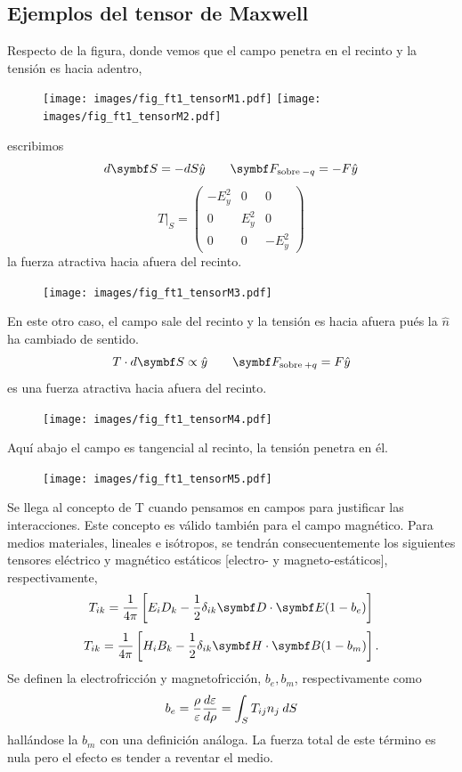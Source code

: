 \documentclass[10pt,oneside]{CBFT_book}
\begin{document}
\subsection{Ejemplos del tensor de Maxwell}

Respecto de la figura, donde vemos que el campo penetra en el recinto y la tensión es hacia adentro,
\begin{figure}[htb]
	\begin{center}
	\texttt{[image: images/fig\_ft1\_tensorM1.pdf]}
	\texttt{[image: images/fig\_ft1\_tensorM2.pdf]}	
	\end{center}
	\caption{}
\end{figure} 
escribimos 
\[
	d\vb{S} = -dS\hat{y} \qquad \vb{F}_{\text{sobre}\:-q} = -F\hat{y}
\]
\[
	T|_S = \begin{pmatrix}
	        -E_y^2	& 0 	& 0 \\
		0	& E_y^2	& 0 \\
		0	& 0	& -E_y^2
	       \end{pmatrix}
\]
la fuerza atractiva hacia afuera del recinto.
\begin{figure}[htb]
	\begin{center}
	\texttt{[image: images/fig\_ft1\_tensorM3.pdf]}	 
	\end{center}
	\caption{}
\end{figure} 

En este otro caso, el campo sale del recinto y la tensión es hacia afuera pués la $\hat{n}$
ha cambiado de sentido.
\[
	T\cdot d\vb{S} \propto \hat{y} \qquad \vb{F}_{\text{sobre}\:+q} = F\hat{y}
\]
es una fuerza atractiva hacia afuera del recinto.
\begin{figure}[htb]
	\begin{center}
	\texttt{[image: images/fig\_ft1\_tensorM4.pdf]}	 
	\end{center}
	\caption{}
\end{figure} 

Aquí abajo el campo es tangencial al recinto, la tensión penetra en él.

\begin{figure}[htb]
	\begin{center}
	\texttt{[image: images/fig\_ft1\_tensorM5.pdf]}	 
	\end{center}
	\caption{}
\end{figure} 

Se llega al concepto de T cuando pensamos en campos para justificar las interacciones.
Este concepto es válido también para el campo magnético.
Para medios materiales, lineales e isótropos, se tendrán consecuentemente los siguientes tensores
eléctrico y magnético estáticos [electro- y magneto-estáticos], respectivamente,
\[
	T_{ik} = \frac{1}{4\pi} \left[ E_iD_k - \frac{1}{2}\delta_{ik} \pe{D}{E}(1-b_e) \right] 
\]
\[
	T_{ik} = \frac{1}{4\pi} \left[ H_iB_k - \frac{1}{2}\delta_{ik} \pe{H}{B}(1-b_m)  \right] .
\]
Se definen la electrofricción y magnetofricción, $b_e,b_m$, respectivamente como
\[
	b_e = \frac{\rho}{\varepsilon} \frac{d^{\hspace{-0.05em}} {\varepsilon}}{d {\rho}^{\hspace{-0.05em}}}  = \int_S T_{ij} n_j \: dS
\]
hallándose la $b_m$ con una definición análoga.
La fuerza total de este término es nula pero el efecto es tender a reventar el medio.
\end{document}
